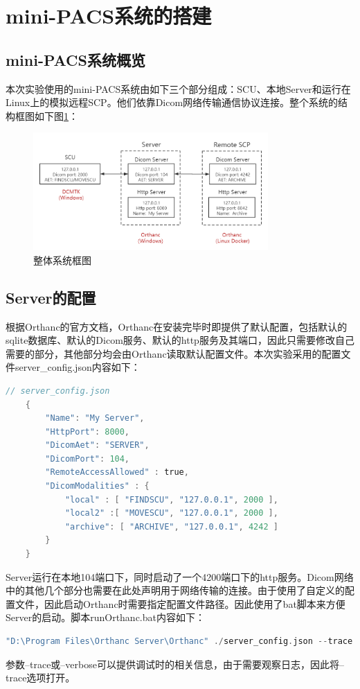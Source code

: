 \documentclass[UTF8]{ctexart}
\begin{document}
\section{mini-PACS系统的搭建}
\subsection{mini-PACS系统概览}
本次实验使用的mini-PACS系统由如下三个部分组成：SCU、本地Server和运行在Linux上的模拟远程SCP。他们依靠Dicom网络传输通信协议连接。整个系统的结构框图如下图\ref{fig:overview}：
\begin{figure}[H]
    \centering
    \includegraphics[width=0.8\textwidth]{overview.png}
    \caption{整体系统框图}
    \label{fig:overview}
\end{figure}
\subsection{Server的配置}
根据Orthanc的官方文档\cite{OrthancBook}，Orthanc在安装完毕时即提供了默认配置，包括默认的sqlite数据库、默认的Dicom服务、默认的http服务及其端口，因此只需要修改自己需要的部分，其他部分均会由Orthanc读取默认配置文件。本次实验采用的配置文件server\_config.json内容如下：

\begin{lstlisting}[language=C]
    // server_config.json
    {
        "Name": "My Server",
        "HttpPort": 8000,
        "DicomAet": "SERVER",
        "DicomPort": 104,
        "RemoteAccessAllowed" : true,
        "DicomModalities" : {
            "local" : [ "FINDSCU", "127.0.0.1", 2000 ],
            "local2" :[ "MOVESCU", "127.0.0.1", 2000 ],
            "archive": [ "ARCHIVE", "127.0.0.1", 4242 ]   
        }
    }
\end{lstlisting}

Server运行在本地104端口下，同时启动了一个4200端口下的http服务。Dicom网络中的其他几个部分也需要在此处声明用于网络传输的连接。由于使用了自定义的配置文件，因此启动Orthanc时需要指定配置文件路径。因此使用了bat脚本来方便Server的启动。脚本runOrthanc.bat内容如下：
\begin{lstlisting}[language=C]
    "D:\Program Files\Orthanc Server\Orthanc" ./server_config.json --trace
\end{lstlisting}
参数--trace或--verbose可以提供调试时的相关信息，由于需要观察日志，因此将--trace选项打开。
\end{document}
